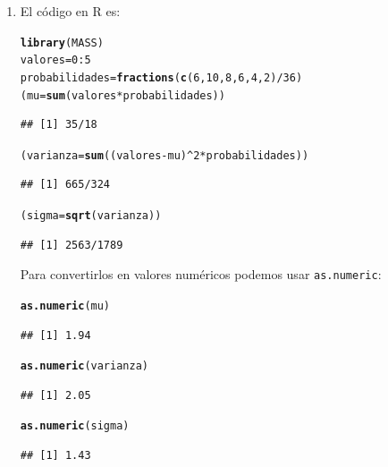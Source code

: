 \documentclass[10pt,a4paper]{article}\usepackage[]{graphicx}\usepackage[]{color}
\makeatletter
\newcommand{\hlnum}[1]{\textcolor[rgb]{0.686,0.059,0.569}{#1}}%
\newcommand{\hlopt}[1]{\textcolor[rgb]{0,0,0}{#1}}%
\newcommand{\hlstd}[1]{\textcolor[rgb]{0.345,0.345,0.345}{#1}}%
\newcommand{\hlkwb}[1]{\textcolor[rgb]{0.69,0.353,0.396}{#1}}%
\newcommand{\hlkwd}[1]{\textcolor[rgb]{0.737,0.353,0.396}{\textbf{#1}}}%
\newenvironment{kframe}{%
 \def\at@end@of@kframe{}%
 \ifinner\ifhmode%
  \def\at@end@of@kframe{\end{minipage}}%
  \begin{minipage}{\columnwidth}%
 \fi\fi%
 \def\FrameCommand##1{\hskip\@totalleftmargin \hskip-\fboxsep
 \colorbox{shadecolor}{##1}\hskip-\fboxsep
     \hskip-\linewidth \hskip-\@totalleftmargin \hskip\columnwidth}%
 \MakeFramed {\advance\hsize-\width
   \@totalleftmargin\z@ \linewidth\hsize
   \@setminipage}}%
 {\par\unskip\endMakeFramed%
 \at@end@of@kframe}
\newenvironment{knitrout}{}{} %
\makeatother
\begin{document}
\begin{enumerate}
  \item El código en R es:
\begin{knitrout}
\color{fgcolor}\begin{kframe}
\begin{alltt}
\hlkwd{library}\hlstd{(MASS)}
\hlstd{valores} \hlkwb{=} \hlnum{0}\hlopt{:}\hlnum{5}
\hlstd{probabilidades} \hlkwb{=} \hlkwd{fractions}\hlstd{(}\hlkwd{c}\hlstd{(}\hlnum{6}\hlstd{,}\hlnum{10}\hlstd{,}\hlnum{8}\hlstd{,}\hlnum{6}\hlstd{,}\hlnum{4}\hlstd{,}\hlnum{2}\hlstd{)}\hlopt{/}\hlnum{36}\hlstd{)}
\hlstd{(mu} \hlkwb{=} \hlkwd{sum}\hlstd{(valores} \hlopt{*} \hlstd{probabilidades))}
\end{alltt}
\begin{verbatim}
## [1] 35/18
\end{verbatim}
\begin{alltt}
\hlstd{(varianza}\hlkwb{=}\hlkwd{sum}\hlstd{((valores}\hlopt{-}\hlstd{mu)}\hlopt{^}\hlnum{2}\hlopt{*}\hlstd{probabilidades) )}
\end{alltt}
\begin{verbatim}
## [1] 665/324
\end{verbatim}
\begin{alltt}
\hlstd{(sigma}\hlkwb{=}\hlkwd{sqrt}\hlstd{(varianza))}
\end{alltt}
\begin{verbatim}
## [1] 2563/1789
\end{verbatim}
\end{kframe}
\end{knitrout}
  Para convertirlos en valores numéricos podemos usar {\tt as.numeric}:
\begin{knitrout}
\color{fgcolor}\begin{kframe}
\begin{alltt}
\hlkwd{as.numeric}\hlstd{(mu)}
\end{alltt}
\begin{verbatim}
## [1] 1.94
\end{verbatim}
\begin{alltt}
\hlkwd{as.numeric}\hlstd{(varianza)}
\end{alltt}
\begin{verbatim}
## [1] 2.05
\end{verbatim}
\begin{alltt}
\hlkwd{as.numeric}\hlstd{(sigma)}
\end{alltt}
\begin{verbatim}
## [1] 1.43
\end{verbatim}
\end{kframe}
\end{knitrout}
\end{enumerate}
\end{document}
